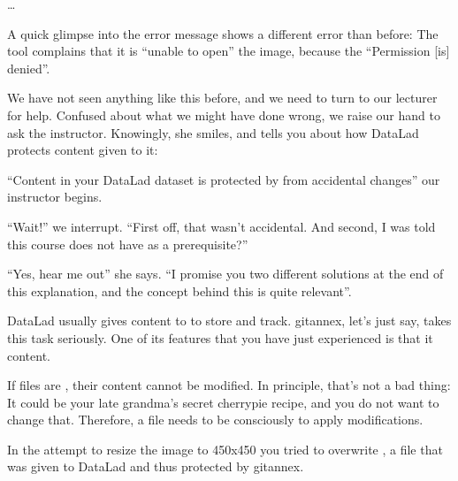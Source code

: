 \sphinxAtStartPar
{}… 

\sphinxAtStartPar
A quick glimpse into the error message shows a different error than before:
The tool complains that it is “unable to open” the image, because the “Permission {[}is{]} denied”.

\sphinxAtStartPar
We have not seen anything like this before, and we need to turn to our lecturer for help.
Confused about what we might have
done wrong, we raise our hand to ask the instructor.
Knowingly, she smiles, and tells you about how DataLad protects content given
to it:

\sphinxAtStartPar
“Content in your DataLad dataset is protected by {\hyperref[\detokenize{glossary:term-git-annex}]{}} from
accidental changes” our instructor begins.

\sphinxAtStartPar
“Wait!” we interrupt. “First off, that wasn’t accidental. And second, I was told this
course does not have  as a prerequisite?”

\sphinxAtStartPar
“Yes, hear me out” she says. “I promise you two different solutions at
the end of this explanation, and the concept behind this is quite relevant”.

\sphinxAtStartPar
DataLad usually gives content to {\hyperref[\detokenize{glossary:term-git-annex}]{}} to store and track.
git\sphinxhyphen{}annex, let’s just say, takes this task  seriously. One of its
features that you have just experienced is that it  content.

\sphinxAtStartPar
If files are , their content cannot be modified. In principle,
that’s not a bad thing: It could be your late grandma’s secret cherry\sphinxhyphen{}pie
recipe, and you do not want to  change that.
Therefore, a file needs to be consciously  to apply modifications.

\sphinxAtStartPar
In the attempt to resize the image to 450x450 you tried to overwrite
, a file that was given to DataLad
and thus protected by git\sphinxhyphen{}annex.

